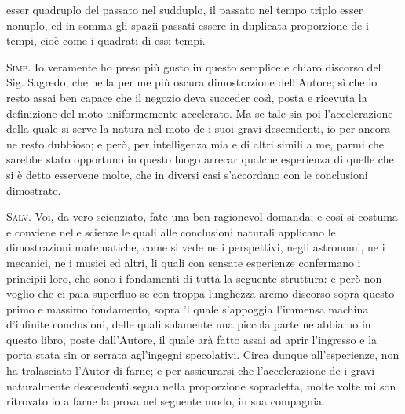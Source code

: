 \documentclass[11pt,twoside,openany]{book}
\newcommand{\speaker}[1]{\textcolor{rubric}{\textsc{#1}}\space}
\begin{document}
esser quadruplo del passato nel sudduplo, il passato nel tempo triplo esser nonuplo, ed in somma gli spazii passati essere in duplicata proporzione de i tempi, cioè come i quadrati di essi tempi.

\speaker{Simp.} Io veramente ho preso più gusto in questo semplice e chiaro discorso del Sig. Sagredo, che nella per me più oscura dimostrazione dell'Autore; sì che io resto assai ben capace che il negozio deva succeder così, posta e ricevuta la definizione del moto uniformemente accelerato. Ma se tale sia poi l'accelerazione della quale si serve la natura nel moto de i suoi gravi descendenti, io per ancora ne resto dubbioso; e però, per intelligenza mia e di altri simili a me, parmi che sarebbe stato opportuno in questo luogo arrecar qualche esperienza di quelle che si è detto esservene molte, che in diversi casi s'accordano con le conclusioni dimostrate.

\speaker{Salv.} Voi, da vero scienziato, fate una ben ragionevol domanda; e così si costuma e conviene nelle scienze le quali alle conclusioni naturali applicano le dimostrazioni matematiche, come si vede ne i perspettivi, negli astronomi, ne i mecanici, ne i musici ed altri, li quali con sensate esperienze confermano i principii loro, che sono i fondamenti di tutta la seguente struttura: e però non voglio che ci paia superfluo se con troppa lunghezza aremo discorso sopra questo primo e massimo fondamento, sopra 'l quale s'appoggia l'immensa machina d'infinite conclusioni, delle quali solamente una piccola parte ne abbiamo in questo libro, poste dall'Autore, il quale arà fatto assai ad aprir l'ingresso e la porta stata sin or serrata agl'ingegni specolativi. Circa dunque all'esperienze, non ha tralasciato l'Autor di farne; e per assicurarsi che l'accelerazione de i gravi naturalmente descendenti segua nella proporzione sopradetta, molte volte mi son ritrovato io a farne la prova nel seguente modo, in sua compagnia.
\end{document}
